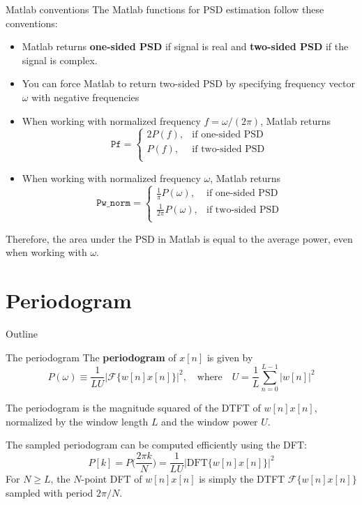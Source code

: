 \documentclass[10pt, aspectratio=169, handout]{beamer}
\begin{document}
%
\begin{frame}{Matlab conventions}
The Matlab functions for PSD estimation follow these conventions:
\begin{itemize}
	\item Matlab returns \textbf{one-sided PSD} if signal is real and \textbf{two-sided PSD} if the signal is complex.
	\item You can force Matlab to return two-sided PSD by specifying frequency vector $\omega$ with negative frequencies
	\item When working with normalized frequency $f = \omega/(2\pi)$, Matlab returns 
	\begin{equation*}
		\texttt{Pf} = \begin{cases}
		2P(f), &\text{if one-sided PSD} \\
		P(f), &\text{if two-sided PSD} \\
		\end{cases}
	\end{equation*}
	\item When working with normalized frequency $\omega$, Matlab returns 	
	\begin{equation*}
	\texttt{Pw\_norm} = \displaystyle\begin{cases}
		\displaystyle\frac{1}{\pi}P(\omega), &\text{if one-sided PSD} \\
		\displaystyle\frac{1}{2\pi}P(\omega), &\text{if two-sided PSD} \\
	\end{cases}
	\end{equation*}
\end{itemize}
Therefore, the area under the PSD in Matlab is equal to the average power, even when working with $\omega$.
\end{frame}

%
\section{Periodogram}
\begin{frame}{Outline}
	\tableofcontents[currentsection]
\end{frame}
\begin{frame}{The periodogram}
	The \textbf{periodogram} of $x[n]$ is given by
	\begin{equation*}
		P(\omega) \equiv \frac{1}{LU}|\mathcal{F}\{w[n]x[n]\}|^2, \quad\text{where}\quad U = \frac{1}{L}\sum_{n = 0}^{L-1}|w[n]|^2
	\end{equation*}
	
	The periodogram is the magnitude squared of the DTFT of $w[n]x[n]$, normalized by the window length $L$ and the window power $U$.
	
	\vspace{0.25cm}
	The sampled periodogram can be computed efficiently using the DFT:
	\begin{equation*}
		P[k] = P\Big(\frac{2\pi k}{N}\Big) = \frac{1}{LU}|\mathrm{DFT}\{w[n]x[n]\}|^2
	\end{equation*}
	For $N \geq L$, the $N$-point DFT of $w[n]x[n]$ is simply the DTFT $\mathcal{F}\{w[n]x[n]\}$ sampled with period $2\pi/N$.
\end{frame}
\end{document}
